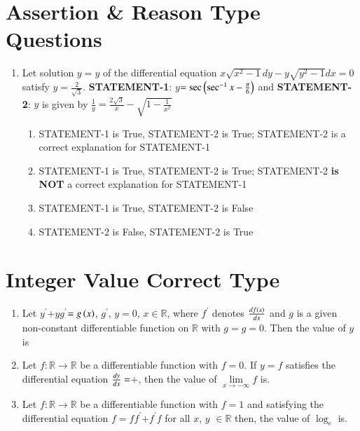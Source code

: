\documentclass[journal]{IEEEtran}
\begin{document}
\section{Assertion \& Reason Type Questions}
\begin{enumerate}
\item Let solution $y=y$ of the differential equation $x\sqrt{x^2-1}dy-y\sqrt{y^2-1}dx=0$ satisfy $y$$=\frac{2}{\sqrt3}$.
	\textbf{STATEMENT-1}: $y$$=\sec{\ensuremath{\left(\sec^{-1}{x}-\frac{\pi}{6}\right)}}$ and 
\textbf{STATEMENT-2}: $y$ is given by $\frac{1}{y}=\frac{2\sqrt3}{x}-\sqrt{1-\frac{1}{x^2}}$ 

		\hfill{}
\begin{enumerate}
\item STATEMENT-1 is True, STATEMENT-2 is True; STATEMENT-2 is a correct explanation for STATEMENT-1
\item STATEMENT-1 is True, STATEMENT-2 is True; STATEMENT-2 \textbf{is NOT} a correct explanation for STATEMENT-1
\item STATEMENT-1 is True, STATEMENT-2 is False
\item STATEMENT-2 is False, STATEMENT-2 is True
\end{enumerate}
\end{enumerate}
\section{Integer Value Correct Type}
\begin{enumerate}
	\item Let $y^{\prime}$$+y$$g^{\prime}$$=g\left(x\right)$, $g^{\prime}$, $y$$=0$, $x\in\mathbb{R}$, where $f^{\prime}$ denotes $\frac{d{{f\left(x\right)}}}{d{x}}$ and $g$ is a given non-constant differentiable function on $\mathbb{R}$ with $g$$=g$$=0$. Then the value of $y$ is 
		
		\hfill{}
\item Let $f:\mathbb{R}\to\mathbb{R}$ be a differentiable function with $f$$=0$. If $y=f$ satisfies the differential equation $\frac{d{y}}{d{x}}=$$+$, then the value of $\lim\limits_{x\to-\infty}f$ is. 
	
	\hfill{}
	\item Let $f:\mathbb{R}\to\mathbb{R}$ be a differentiable function with $f$$=1$ and satisfying the differential equation $f$$=f$$f^{\prime}$$+f^{\prime}$$f$ for all $x$, $y$ $\in \mathbb{R}$ then, the value of $\log_e$  is. 
	
		\hfill{}
\end{enumerate}
\end{document}

